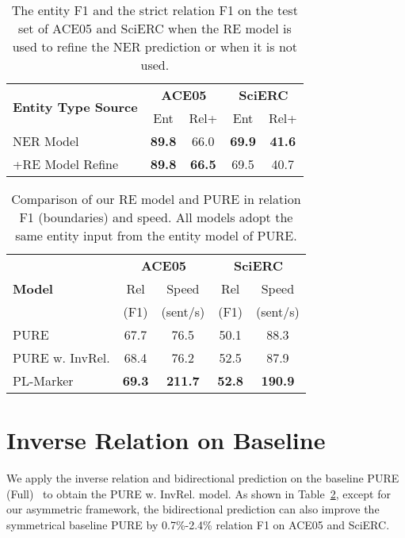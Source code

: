 \documentclass[11pt]{article}
\newcommand\Ourmodel{PL-Marker\xspace}
\begin{document}
\begin{table}[!t]
\small


\centering
\begin{tabular}{l|cc|cc}

\toprule
\multirow{2}{*}{\textbf{Entity Type Source}} & \multicolumn{2}{c|}{\textbf{ACE05}} & \multicolumn{2}{c}{\textbf{SciERC}} \\
 & Ent & Rel+  & Ent & Rel+ \\
\midrule
NER Model  & \textbf{89.8}  &  66.0 &   \textbf{69.9}  & \textbf{41.6}   \\
+RE Model Refine &  \textbf{89.8} & \textbf{66.5} & {69.5} & 40.7 \\
\bottomrule
\end{tabular}
 \caption{The entity F1 and the strict relation F1 on the test set of ACE05 and SciERC   when the RE model is used to refine the NER prediction or when it is not used. }\label{tab:ablation_re_refile}


\end{table}


\begin{table}[!t]
\small
\centering
\begin{tabular}{l|cc|cc}
\toprule
\multirow{3}{*}{\textbf{Model}} & \multicolumn{2}{c|}{\textbf{ACE05}} & \multicolumn{2}{c}{\textbf{SciERC}} \\
& Rel & Speed & Rel & Speed \\
& (F1) & (sent/s) & (F1) & (sent/s) \\
\midrule
PURE  & 67.7 &  76.5 & 50.1 &  88.3 \\
PURE w. InvRel.& 68.4 & 76.2 & 52.5 & 87.9  \\
\midrule
\Ourmodel &  \textbf{69.3} & \textbf{211.7}  & \textbf{52.8}  & \textbf{190.9} \\
\bottomrule
\end{tabular}
 \caption{Comparison of our RE model and  PURE in relation F1 (boundaries) and speed. All models adopt the same entity input from the entity model of PURE. 
 }

 \label{tab:respeed2}


\end{table}


\section{Inverse Relation on Baseline}
We apply the inverse relation and bidirectional prediction on the baseline PURE (Full)~\cite{PURE} to obtain the PURE w. InvRel. model. As shown in Table~\ref{tab:respeed2}, except for our asymmetric framework, the bidirectional prediction can also improve the symmetrical baseline PURE by 0.7\%-2.4\% relation F1 on ACE05 and SciERC. 
\end{document}
